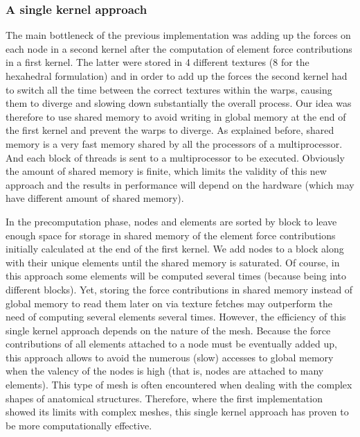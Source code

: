 \subsubsection*{A single kernel approach}
The main bottleneck of the previous implementation was adding up the forces on each node in a second kernel after the computation of element force contributions in a first kernel. The latter were stored in 4 different textures (8 for the hexahedral formulation) and in order to add up the forces the second kernel had to switch all the time between the correct textures within the warps, causing them to diverge and slowing down substantially the overall process. Our idea was therefore to use shared memory to avoid writing in global memory at the end of the first kernel and prevent the warps to diverge. As explained before, shared memory is a very fast memory shared by all the processors of a multiprocessor. And each block of threads is sent to a multiprocessor to be executed. Obviously the amount of shared memory is finite, which limits the validity of this new approach and the results in performance will depend on the hardware (which may have different amount of shared memory). 

In the precomputation phase, nodes and elements are sorted by block to leave enough space for storage in shared memory of the element force contributions initially calculated at the end of the first kernel. We add nodes to a block along with their unique elements until the shared memory is saturated. Of course, in this approach some elements will be computed several times (because being into different blocks). \ON Yet, \OFF storing the force contributions in shared memory instead of global memory to read them later on via texture fetches \ON may \OFF outperform the need of computing several elements several times. \ON However, the efficiency of this single kernel approach depends on the nature of the mesh. Because the force contributions of all elements attached to a node must be eventually added up, this approach allows to avoid the numerous (slow) accesses to global memory when the valency of the nodes is high (that is, nodes are attached to many elements). This type of mesh is often encountered when dealing with the complex shapes of anatomical structures. Therefore, where the first implementation showed its limits with complex meshes, this single kernel approach has proven to be more computationally effective. 
\OFF 


